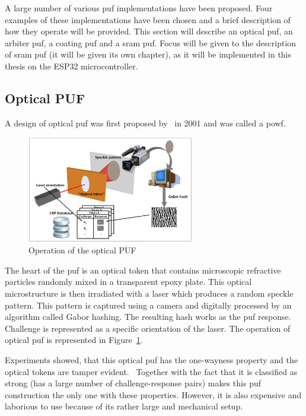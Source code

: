 A large number of various \gls{puf} implementations have been proposed. Four examples of these implementations have been chosen and a brief description of how they operate will be provided. This section will describe an optical \gls{puf}, an arbiter \gls{puf}, a coating \gls{puf} and a \gls{sram} \gls{puf}. Focus will be given to the description of \gls{sram} \gls{puf} (it will be given its own chapter), as it will be implemented in this thesis on the ESP32 microcontroller.

\subsection{Optical PUF}\label{sec:optical_puf}

A design of optical \gls{puf} was first proposed by~\cite{Pappu2001} in 2001 and was called a \glsdesc{powf}.

\begin{figure}[h!]
    \centering
    \captionsetup{justification=centering,margin=0.5cm}
    \includegraphics[width=0.65\textwidth]{images/optical_puf.png}
    \caption[Operation of the optical PUF]{Operation of the optical PUF}
    \label{fig:optical_puf}
\end{figure}

The heart of the \gls{puf} is an optical token that contains microscopic refractive particles randomly mixed in a transparent epoxy plate. This optical microstructure is then irradiated with a laser which produces a random speckle pattern. This pattern is captured using a camera and digitally processed by an algorithm called Gabor hashing. The resulting hash works as the \gls{puf} response. Challenge is represented as a specific orientation of the laser. The operation of optical \gls{puf} is represented in Figure~\ref{fig:optical_puf}.

Experiments showed, that this optical \gls{puf} has the one-wayness property and the optical tokens are tamper evident.~\cite{Pappu2002} Together with the fact that it is classified as strong (has a large number of challenge-response pairs) makes this \gls{puf} construction the only one with these properties. However, it is also expensive and laborious to use because of its rather large and mechanical setup.~\cite{Maes2012}


